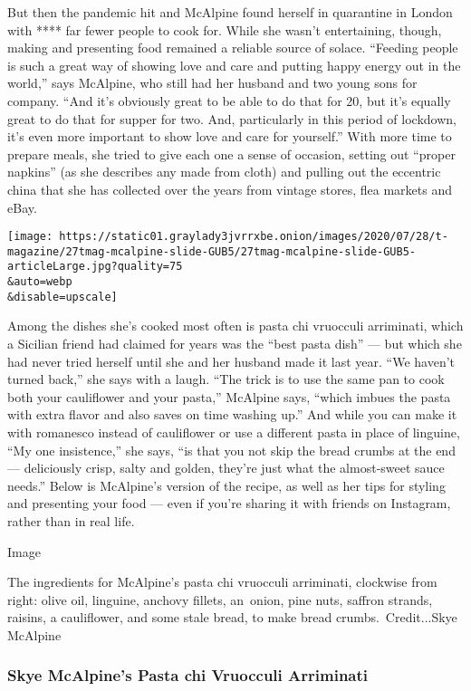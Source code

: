 But then the pandemic hit and McAlpine found herself in quarantine in
London with **** far fewer people to cook for. While she wasn't
entertaining, though, making and presenting food remained a reliable
source of solace. ``Feeding people is such a great way of showing love
and care and putting happy energy out in the world,'' says McAlpine, who
still had her husband and two young sons for company. ``And it's
obviously great to be able to do that for 20, but it's equally great to
do that for supper for two. And, particularly in this period of
lockdown, it's even more important to show love and care for yourself.''
With more time to prepare meals, she tried to give each one a sense of
occasion, setting out ``proper napkins'' (as she describes any made from
cloth) and pulling out the eccentric china that she has collected over
the years from vintage stores, flea markets and eBay.

\texttt{[image: https://static01.graylady3jvrrxbe.onion/images/2020/07/28/t-magazine/27tmag-mcalpine-slide-GUB5/27tmag-mcalpine-slide-GUB5-articleLarge.jpg?quality=75\\\&auto=webp\\\&disable=upscale]}

Among the dishes she's cooked most often is pasta chi vruocculi
arriminati, which a Sicilian friend had claimed for years was the ``best
pasta dish'' --- but which she had never tried herself until she and her
husband made it last year. ``We haven't turned back,'' she says with a
laugh. ``The trick is to use the same pan to cook both your cauliflower
and your pasta,'' McAlpine says, ``which imbues the pasta with extra
flavor and also saves on time washing up.'' And while you can make it
with romanesco instead of cauliflower or use a different pasta in place
of linguine, ``My one insistence,'' she says, ``is that you not skip the
bread crumbs at the end --- deliciously crisp, salty and golden, they're
just what the almost-sweet sauce needs.'' Below is McAlpine's version of
the recipe, as well as her tips for styling and presenting your food ---
even if you're sharing it with friends on Instagram, rather than in real
life.

Image

The ingredients for McAlpine's pasta chi vruocculi arriminati, clockwise
from right: olive oil, linguine, anchovy fillets, an~onion, pine nuts,
saffron strands, raisins, a cauliflower, and some stale bread, to make
bread crumbs.~Credit...Skye McAlpine

\hypertarget{skye-mcalpines-pasta-chi-vruocculi-arriminati}{%
\subsubsection{\texorpdfstring{\textbf{Skye McAlpine's} Pasta chi
Vruocculi
Arriminati}{Skye McAlpine's Pasta chi Vruocculi Arriminati}}\label{skye-mcalpines-pasta-chi-vruocculi-arriminati}}

